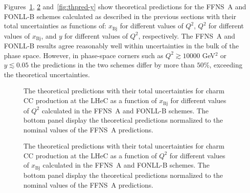 \documentclass[pdftex,twocolumn,epjc3]{svjour3}          %
\newcommand{\xbj}{\ensuremath{x_{\text{Bj}}}\xspace}
\newcommand{\fonll} {{FONLL-B}\xspace}
\newcommand{\ffns} {{FFNS~A}\xspace}
\begin{document}
Figures~\ref{fig:thpred-x}, \ref{fig:thpred-q2} and~\ref{fig:thpred-y}
show theoretical predictions for the \ffns and \fonll schemes 
calculated as described in the previous sections 
with their total uncertainties as functions of: \xbj for different values
of $Q^2$, $Q^2$ for different values of \xbj, and $y$ for different
values of $Q^2$, respectively.
%
The \ffns and \fonll results agree reasonably well within
uncertainties in the bulk of the phase space. However, in phase-space
corners such as $Q^2 \gtrsim 10000$ GeV$^2$ or $y \lesssim 0.05$ the
predictions in the two schemes differ by more than $50\%$, exceeding
the theoretical uncertainties.

\begin{figure}
    \centering
    \caption{The theoretical predictions with their total
      uncertainties for charm CC production at the LHeC as a function
      of \xbj for different values of $Q^2$ calculated in the \ffns
      and \fonll schemes. The bottom panel display the theoretical
      predictions normalized to the nominal values of the \ffns
      predictions.}
    \label{fig:thpred-x}
\end{figure}

\begin{figure}
    \centering
    \caption{The theoretical predictions with their total
      uncertainties for charm CC production at the LHeC as a function
      of $Q^2$ for different values of \xbj calculated in the \ffns
      and \fonll schemes. The bottom panel display the theoretical
      predictions normalized to the nominal values of the \ffns
      predictions.}
    \label{fig:thpred-q2}
\end{figure}
\end{document}
